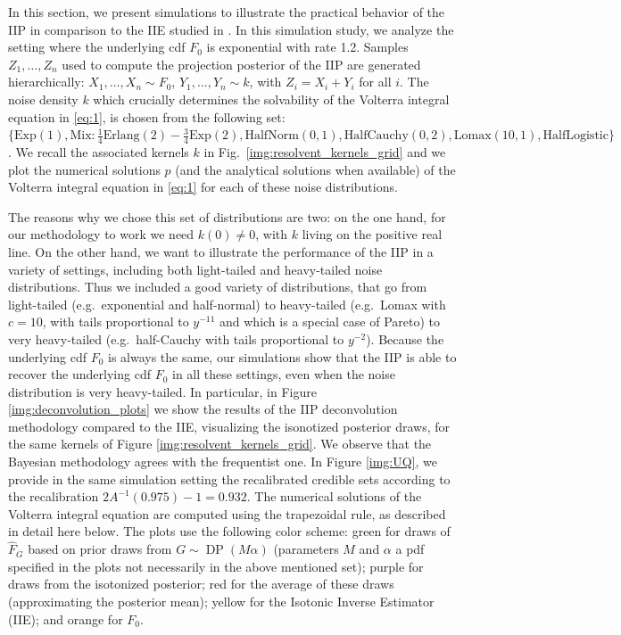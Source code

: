 In this section, we present simulations to illustrate the practical behavior of the IIP in comparison to the IIE studied in \cite{74}. In this simulation study, we analyze the setting where the underlying cdf \( F_0 \) is exponential with rate 1.2. Samples \( Z_1, \ldots, Z_n \) used to compute the projection posterior of the IIP are generated hierarchically: \( X_1, \ldots, X_n \sim F_0 \), \( Y_1, \ldots, Y_n \sim k\), with \( Z_i = X_i + Y_i \) for all \( i \). The noise density $k$ which crucially determines the solvability of the Volterra integral equation in \eqref{eq:1}, is chosen from the following set: $\{ \mathrm{Exp}(1), \mathrm{Mix}: \frac{1}{4} \mathrm{Erlang}(2)- \frac{3}{4} \mathrm{Exp}(2), \mathrm{HalfNorm}(0,1), \mathrm{HalfCauchy}(0,2), \mathrm{Lomax}(10,1), \mathrm{HalfLogistic}\}$. We recall the associated kernels $k$ in Fig.\ \ref{img:resolvent_kernels_grid} and we plot the numerical solutions $p$ (and the analytical solutions when available) of the Volterra integral equation in \eqref{eq:1} for each of these noise distributions.


The reasons why we chose this set of distributions are two: on the one hand, for our methodology to work we need $k(0) \neq 0$, with $k$ living on the positive real line. On the other hand, we want to illustrate the performance of the IIP in a variety of settings, including both light-tailed and heavy-tailed noise distributions. Thus we included a good variety of distributions, that go from light-tailed (e.g.\ exponential and half-normal) to heavy-tailed (e.g.\ Lomax with $c=10$, with tails proportional to $y^{-11}$ and which is a special case of Pareto) to very heavy-tailed (e.g.\ half-Cauchy with tails proportional to $y^{-2}$). Because the underlying cdf $F_0$ is always the same, our simulations show that the IIP is able to recover the underlying cdf $F_0$ in all these settings, even when the noise distribution is very heavy-tailed. In particular, in Figure \ref{img:deconvolution_plots} we show the results of the IIP deconvolution methodology compared to the IIE, visualizing the isonotized posterior draws, for the same kernels of Figure \ref{img:resolvent_kernels_grid}. We observe that the Bayesian methodology agrees with the frequentist one. In Figure \ref{img:UQ}, we provide in the same simulation setting the recalibrated credible sets according to the recalibration $2A^{-1}(0.975) -1 = 0.932$. The numerical solutions of the Volterra integral equation are computed using the trapezoidal rule, as described in detail here below. The plots use the following color scheme: green for draws of \( \hat{F}_{\scriptscriptstyle{G}} \) based on prior draws from \( G \sim \operatorname{DP}(M \alpha) \) (parameters \( M \) and \( \alpha \) a pdf specified in the plots not necessarily in the above mentioned set); purple for draws from the isotonized posterior; red for the average of these draws (approximating the posterior mean);  yellow for the Isotonic Inverse Estimator (IIE); and orange for \( F_0 \). 

